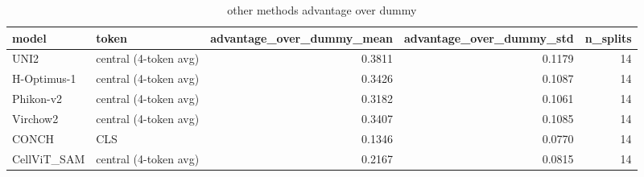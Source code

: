 \begin{table}
\caption{other methods advantage over dummy}
\label{tab:other_methods_advantage_over_dummy}
\begin{tabular}{llrrr}
\toprule
model & token & advantage_over_dummy_mean & advantage_over_dummy_std & n_splits \\
\midrule
UNI2 & central (4-token avg) & 0.3811 & 0.1179 & 14 \\
H-Optimus-1 & central (4-token avg) & 0.3426 & 0.1087 & 14 \\
Phikon-v2 & central (4-token avg) & 0.3182 & 0.1061 & 14 \\
Virchow2 & central (4-token avg) & 0.3407 & 0.1085 & 14 \\
CONCH & CLS & 0.1346 & 0.0770 & 14 \\
CellViT_SAM & central (4-token avg) & 0.2167 & 0.0815 & 14 \\
\bottomrule
\end{tabular}
\end{table}
